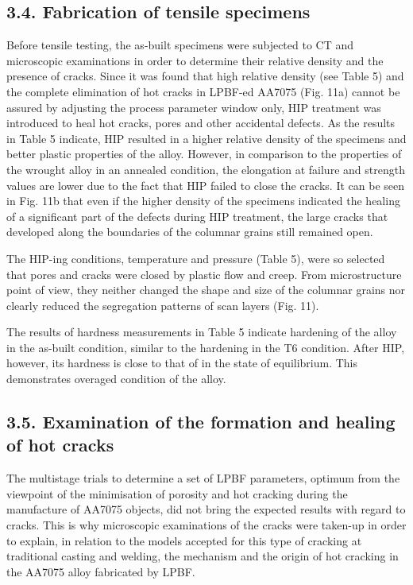 \documentclass[10pt]{article}
\begin{document}
\subsection*{3.4. Fabrication of tensile specimens}
Before tensile testing, the as-built specimens were subjected to CT and microscopic examinations in order to determine their relative density and the presence of cracks. Since it was found that high relative density (see Table 5) and the complete elimination of hot cracks in LPBF-ed AA7075 (Fig. 11a) cannot be assured by adjusting the process parameter window only, HIP treatment was introduced to heal hot cracks, pores and other accidental defects. As the results in Table 5 indicate, HIP resulted in a higher relative density of the specimens and better plastic properties of the alloy. However, in comparison to the properties of the wrought alloy in an annealed condition, the elongation at failure and strength values are lower due to the fact that HIP failed to close the cracks. It can be seen in Fig. 11b that even if the higher density of the specimens indicated the healing of a significant part of the defects during HIP treatment, the large cracks that developed along the boundaries of the columnar grains still remained open.

The HIP-ing conditions, temperature and pressure (Table 5), were so selected that pores and cracks were closed by plastic flow and creep. From microstructure point of view, they neither changed the shape and size of the columnar grains nor clearly reduced the segregation patterns of scan layers (Fig. 11).

The results of hardness measurements in Table 5 indicate hardening of the alloy in the as-built condition, similar to the hardening in the T6 condition. After HIP, however, its hardness is close to that of in the state of equilibrium. This demonstrates overaged condition of the alloy.

\subsection*{3.5. Examination of the formation and healing of hot cracks}
The multistage trials to determine a set of LPBF parameters, optimum from the viewpoint of the minimisation of porosity and hot cracking during the manufacture of AA7075 objects, did not bring the expected results with regard to cracks. This is why microscopic examinations of the cracks were taken-up in order to explain, in relation to the models accepted for this type of cracking at traditional casting and welding, the mechanism and the origin of hot cracking in the AA7075 alloy fabricated by LPBF.
\end{document}
